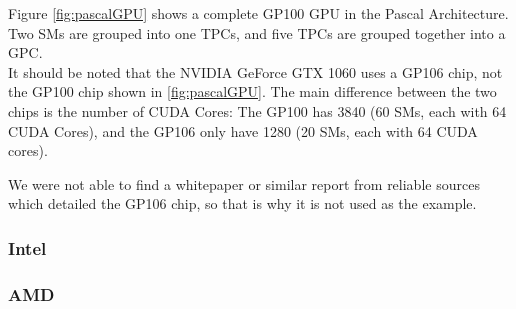 	
Figure \ref{fig:pascalGPU} shows a complete GP100 GPU in the Pascal Architecture.
Two \glspl{SM} are grouped into one \glspl{TPC}, and five \glspl{TPC} are grouped together into a \gls{GPC}. \\

It should be noted that the NVIDIA GeForce GTX 1060 uses a GP106 chip, not the GP100 chip shown in \ref{fig:pascalGPU}. 
The main difference between the two chips is the number of CUDA Cores: The GP100 has 3840 (60 \glspl{SM}, each with 64 CUDA Cores), and the GP106 only have 1280 (20 \glspl{SM}, each with 64 CUDA cores).

We were not able to find a whitepaper or similar report from reliable sources which detailed the GP106 chip, so that is why it is not used as the example. 


\subsubsection{Intel}


\subsubsection{AMD}
